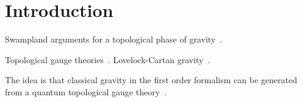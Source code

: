 \documentclass[../main.tex]{subfiles}
\begin{document}
\section{Introduction}\label{sec:introduction}

Swampland arguments for a topological phase of gravity~\cite{agrawal2020a}.

Topological gauge theories~\cite{brandhuber1994a,sadovski2017c,sadovski2018a,sadovski2018b,sadovski2020}. Lovelock-Cartan gravity~\cite{mardones1991a,sadovski2017a}.

The idea is that classical gravity in the first order formalism can be generated from a quantum topological gauge theory~\cite{sako1997a,mielke2011a}.
\end{document}
